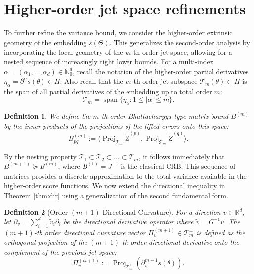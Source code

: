 \documentclass[pdflatex,sn-mathphys-num]{sn-jnl}%
\theoremstyle{thmstyleone}%
\theoremstyle{thmstyletwo}%
\theoremstyle{thmstylethree}%
\newtheorem{definition}{Definition}%
\begin{document}
\section{Higher-order jet space refinements}
\label{sec:ho}
To further refine the variance bound, we consider the higher-order extrinsic geometry of the embedding $s(\Theta)$. This generalizes the second-order analysis by incorporating the local geometry of the $m$-th order jet space, allowing for a nested sequence of increasingly tight lower bounds. For a multi-index $\alpha = (\alpha_1, \dots, \alpha_d) \in \mathbb{N}_0^d$, recall the notation of the higher-order partial derivatives $\eta_\alpha = \partial^\alpha s(\theta) \in H$.
Also recall that the $m$-th order jet subspace $\mathcal{T}_m(\theta) \subset H$ is the span of all partial derivatives of the embedding up to total order $m$:
\[
\mathcal{T}_m = \operatorname{span} \{ \eta_\alpha : 1 \le |\alpha| \le m \}.
\]

\begin{definition}
We define the $m$-th order Bhattacharyya-type matrix bound $B^{(m)}$ by the inner products of the projections of the lifted errors onto this space:
\[
B^{(m)}_{pq} := \langle \operatorname{Proj}_{\mathcal{T}_m} \widetilde{Z}^{(p)}, \operatorname{Proj}_{\mathcal{T}_m} \widetilde{Z}^{(q)} \rangle.
\]
\end{definition}

By the nesting property $\mathcal{T}_1 \subset \mathcal{T}_2 \subset \dots \subset \mathcal{T}_m$, it follows immediately that $B^{(m+1)} \succeq B^{(m)}$, where $B^{(1)} = J^{-1}$ is the classical CRB. This sequence of matrices provides a discrete approximation to the total variance available in the higher-order score functions. We now extend the directional inequality in Theorem \ref{thm:dir} using a generalization of the second fundamental form.

\begin{definition}[Order-$(m+1)$ Directional Curvature]
For a direction $v \in \mathbb{R}^d$, let $\partial_v = \sum_{i=1}^d \tilde{v}_i \partial_i$ be the directional derivative operator where $\tilde{v} = G^{-1}v$. The $(m+1)$-th order directional curvature vector $\Pi_v^{(m+1)} \in \mathcal{T}_m^\perp$ is defined as the orthogonal projection of the $(m+1)$-th order directional derivative onto the complement of the previous jet space:
\[
\Pi_v^{(m+1)} := \operatorname{Proj}_{\mathcal{T}_m^\perp} \left( \partial_v^{m+1} s(\theta) \right).
\]
\end{definition}
\end{document}
